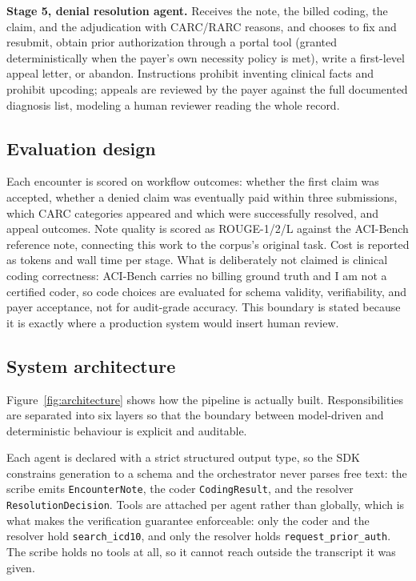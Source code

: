 \documentclass[sigconf,nonacm]{acmart}
\begin{document}
\textbf{Stage 5, denial resolution agent.} Receives the note, the billed
coding, the claim, and the adjudication with CARC/RARC reasons, and chooses
to fix and resubmit, obtain prior authorization through a portal tool
(granted deterministically when the payer's own necessity policy is met),
write a first-level appeal letter, or abandon. Instructions prohibit
inventing clinical facts and prohibit upcoding; appeals are reviewed by the
payer against the full documented diagnosis list, modeling a human reviewer
reading the whole record.

\subsection{Evaluation design}
Each encounter is scored on workflow outcomes: whether the first claim was
accepted, whether a denied claim was eventually paid within three
submissions, which CARC categories appeared and which were successfully
resolved, and appeal outcomes. Note quality is scored as ROUGE-1/2/L against
the ACI-Bench reference note, connecting this work to the corpus's original
task. Cost is reported as tokens and wall time per stage. What is
deliberately not claimed is clinical coding correctness: ACI-Bench carries no
billing ground truth and I am not a certified coder, so code choices are
evaluated for schema validity, verifiability, and payer acceptance, not for
audit-grade accuracy. This boundary is stated because it is exactly where a
production system would insert human review.

\subsection{System architecture}
Figure~\ref{fig:architecture} shows how the pipeline is actually built.
Responsibilities are separated into six layers so that the boundary between
model-driven and deterministic behaviour is explicit and auditable.

Each agent is declared with a strict structured output type, so the SDK
constrains generation to a schema and the orchestrator never parses free
text: the scribe emits \texttt{EncounterNote}, the coder
\texttt{CodingResult}, and the resolver \texttt{ResolutionDecision}. Tools
are attached per agent rather than globally, which is what makes the
verification guarantee enforceable: only the coder and the resolver hold
\texttt{search\_icd10}, and only the resolver holds
\texttt{request\_prior\_auth}. The scribe holds no tools at all, so it
cannot reach outside the transcript it was given.
\end{document}
